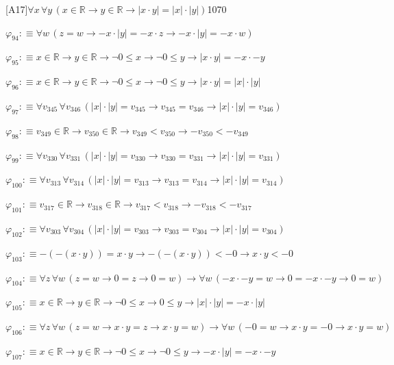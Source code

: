 \begin{fullproof}{[A17]}{$\forall x\,\forall y\,(x \in \mathbb{R} \to y \in \mathbb{R} \to \lvert x \cdot y \rvert = \lvert x \rvert \cdot \lvert y \rvert)$}{1070}
\begin{abbrevlist}
\item $\varphi_{94} :\equiv \forall w\,(z = w \to -x \cdot \lvert y \rvert = -x \cdot z \to -x \cdot \lvert y \rvert = -x \cdot w)$
\item $\varphi_{95} :\equiv x \in \mathbb{R} \to y \in \mathbb{R} \to \neg 0 \leq x \to \neg 0 \leq y \to \lvert x \cdot y \rvert = -x \cdot -y$
\item $\varphi_{96} :\equiv x \in \mathbb{R} \to y \in \mathbb{R} \to \neg 0 \leq x \to \neg 0 \leq y \to \lvert x \cdot y \rvert = \lvert x \rvert \cdot \lvert y \rvert$
\item $\varphi_{97} :\equiv \forall v_{345}\,\forall v_{346}\,(\lvert x \rvert \cdot \lvert y \rvert = v_{345} \to v_{345} = v_{346} \to \lvert x \rvert \cdot \lvert y \rvert = v_{346})$
\item $\varphi_{98} :\equiv v_{349} \in \mathbb{R} \to v_{350} \in \mathbb{R} \to v_{349} < v_{350} \to -v_{350} < -v_{349}$
\item $\varphi_{99} :\equiv \forall v_{330}\,\forall v_{331}\,(\lvert x \rvert \cdot \lvert y \rvert = v_{330} \to v_{330} = v_{331} \to \lvert x \rvert \cdot \lvert y \rvert = v_{331})$
\item $\varphi_{100} :\equiv \forall v_{313}\,\forall v_{314}\,(\lvert x \rvert \cdot \lvert y \rvert = v_{313} \to v_{313} = v_{314} \to \lvert x \rvert \cdot \lvert y \rvert = v_{314})$
\item $\varphi_{101} :\equiv v_{317} \in \mathbb{R} \to v_{318} \in \mathbb{R} \to v_{317} < v_{318} \to -v_{318} < -v_{317}$
\item $\varphi_{102} :\equiv \forall v_{303}\,\forall v_{304}\,(\lvert x \rvert \cdot \lvert y \rvert = v_{303} \to v_{303} = v_{304} \to \lvert x \rvert \cdot \lvert y \rvert = v_{304})$
\item $\varphi_{103} :\equiv -(-(x \cdot y)) = x \cdot y \to -(-(x \cdot y)) < -0 \to x \cdot y < -0$
\item $\varphi_{104} :\equiv \forall z\,\forall w\,(z = w \to 0 = z \to 0 = w) \to \forall w\,(-x \cdot -y = w \to 0 = -x \cdot -y \to 0 = w)$
\item $\varphi_{105} :\equiv x \in \mathbb{R} \to y \in \mathbb{R} \to \neg 0 \leq x \to 0 \leq y \to \lvert x \rvert \cdot \lvert y \rvert = -x \cdot \lvert y \rvert$
\item $\varphi_{106} :\equiv \forall z\,\forall w\,(z = w \to x \cdot y = z \to x \cdot y = w) \to \forall w\,(-0 = w \to x \cdot y = -0 \to x \cdot y = w)$
\item $\varphi_{107} :\equiv x \in \mathbb{R} \to y \in \mathbb{R} \to \neg 0 \leq x \to \neg 0 \leq y \to -x \cdot \lvert y \rvert = -x \cdot -y$

\end{abbrevlist}
\end{fullproof}
